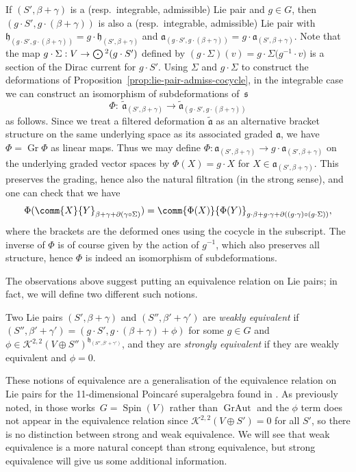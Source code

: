 \documentclass[pdftex]{sigma}
\numberwithin{equation}{section}
\newcommand{\fa}{\mathfrak{a}}
\newcommand{\fh}{\mathfrak{h}}
\newcommand{\fs}{\mathfrak{s}}
\newcommand{\cK}{\mathcal{K}}
\newcommand{\fatilde}{\widetilde{\fa}}
\newcommand{\Odot}{\mathchoice{{\textstyle\bigodot}}{\bigodot}{\bigodot}{\bigodot}}
\newcommand{\1}{\mathbbm{1}}
\DeclareMathOperator{\Spin}{Spin}
\DeclareMathOperator{\Gr}{Gr}
\DeclareMathOperator{\GrAut}{GrAut}
\begin{document}
If $(S',\beta+\gamma)$ is a (resp.\ integrable, admissible) Lie pair and $g\in G$, then $(g\cdot S',g\cdot(\beta+\gamma))$ is also a (resp.\ integrable, admissible) Lie pair with
$\fh_{(g\cdot S',g\cdot(\beta+\gamma))}=g\cdot\fh_{(S',\beta+\gamma)}$ and $ \fa_{(g\cdot S',g\cdot(\beta+\gamma))}=g\cdot\fa_{(S',\beta+\gamma)}$.
Note that the map $g\cdot\Sigma:V\to\Odot^2(g\cdot S')$ defined by $(g\cdot\Sigma)(v)=g\cdot\Sigma\bigl(g^{-1}\cdot v\bigr)$ is a section of the Dirac current for $g\cdot S'$. Using $\Sigma$ and $g\cdot\Sigma$ to construct the deformations of Proposition~\ref{prop:lie-pair-admiss-cocycle}, in the integrable case we can construct an isomorphism of subdeformations of~$\fs$
\[
	\Phi\colon\ \fatilde_{(S',\beta+\gamma)} \to \fatilde_{(g\cdot S',g\cdot(\beta+\gamma))}
\]
as follows. Since we treat a filtered deformation $\fatilde$ as an alternative bracket structure on the same underlying space as its associated graded $\fa$, we have $\Phi=\Gr\Phi$ as linear maps. Thus we may define $\Phi\colon\fa_{(S',\beta+\gamma)}\to g\cdot\fa_{(S',\beta+\gamma)}$ on the underlying graded vector spaces by $\Phi(X)=g\cdot X$ for $X\in\fa_{(S',\beta+\gamma)}$. This preserves the grading, hence also the natural filtration (in the strong sense), and one can check that we have
\[
	\Phi(\comm{X}{Y}_{\beta+\gamma+\partial(\gamma\circ\Sigma)}) = \comm{\Phi(X)}{\Phi(Y)}_{g\cdot\beta+g\cdot\gamma+\partial((g\cdot\gamma)\circ(g\cdot\Sigma))},
\]
where the brackets are the deformed ones using the cocycle in the subscript. The inverse of $\Phi$ is of course given by the action of $g^{-1}$, which also preserves all structure, hence $\Phi$ is indeed an isomorphism of subdeformations.

The observations above suggest putting an equivalence relation on Lie pairs; in fact, we will define two different such notions.

\begin{Definition}\label{def:lie-pair-equiv}
	Two Lie pairs $(S',\beta+\gamma)$ and $(S'',\beta'+\gamma')$ are \emph{weakly equivalent} if $(S'',\beta'+\gamma')=(g\cdot S',g\cdot(\beta+\gamma)+\phi)$ for some $g\in G$ and $\phi\in\cK^{2,2}(V\oplus S'')^{\fh_{(S'',\beta'+\gamma')}}$, and they are \emph{strongly equivalent} if they are weakly equivalent and $\phi=0$.
\end{Definition}

These notions of equivalence are a generalisation of the equivalence relation on Lie pairs for the 11-dimensional Poincar\'e superalgebra found in \cite{Figueroa-OFarrill2017_1,Santi2022}. As previously noted, in those works~${G=\Spin(V)}$ rather than $\GrAut$ and the $\phi$ term does not appear in the equivalence relation since $\cK^{2,2}(V\oplus S')=0$ for all $S'$, so there is no distinction between strong and weak equivalence. We will see that weak equivalence is a more natural concept than strong equivalence, but strong equivalence will give us some additional information.
\end{document}
